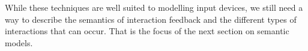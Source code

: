 % 
% 
% 
% 
% 
% 	

While these techniques are well suited to modelling input devices, we still need a way to describe the semantics of interaction feedback and the different types of interactions that can occur. That is the focus of the next section on semantic models.	

